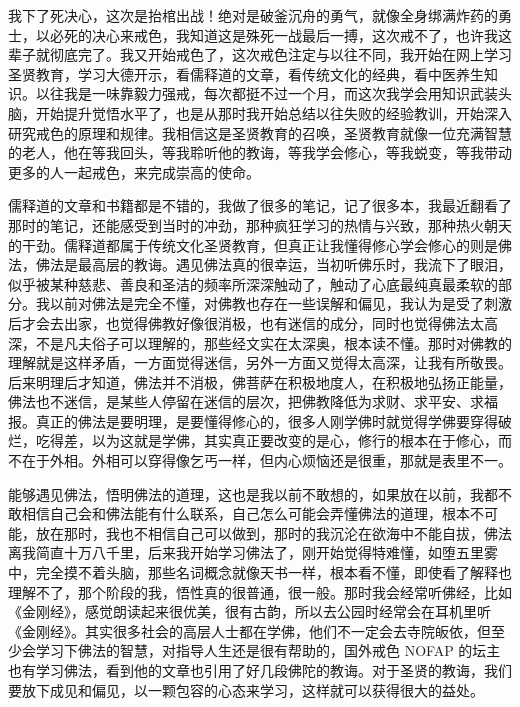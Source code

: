 我下了死决心，这次是抬棺出战！绝对是破釜沉舟的勇气，就像全身绑满炸药的勇士，以必死的决心来戒色，我知道这是殊死一战最后一搏，这次戒不了，也许我这辈子就彻底完了。我又开始戒色了，这次戒色注定与以往不同，我开始在网上学习圣贤教育，学习大德开示，看儒释道的文章，看传统文化的经典，看中医养生知识。以往我是一味靠毅力强戒，每次都挺不过一个月，而这次我学会用知识武装头脑，开始提升觉悟水平了，也是从那时我开始总结以往失败的经验教训，开始深入研究戒色的原理和规律。我相信这是圣贤教育的召唤，圣贤教育就像一位充满智慧的老人，他在等我回头，等我聆听他的教诲，等我学会修心，等我蜕变，等我带动更多的人一起戒色，来完成崇高的使命。

儒释道的文章和书籍都是不错的，我做了很多的笔记，记了很多本，我最近翻看了那时的笔记，还能感受到当时的冲劲，那种疯狂学习的热情与兴致，那种热火朝天的干劲。儒释道都属于传统文化圣贤教育，但真正让我懂得修心学会修心的则是佛法，佛法是最高层的教诲。遇见佛法真的很幸运，当初听佛乐时，我流下了眼泪，似乎被某种慈悲、善良和圣洁的频率所深深触动了，触动了心底最纯真最柔软的部分。我以前对佛法是完全不懂，对佛教也存在一些误解和偏见，我认为是受了刺激后才会去出家，也觉得佛教好像很消极，也有迷信的成分，同时也觉得佛法太高深，不是凡夫俗子可以理解的，那些经文实在太深奥，根本读不懂。那时对佛教的理解就是这样矛盾，一方面觉得迷信，另外一方面又觉得太高深，让我有所敬畏。后来明理后才知道，佛法并不消极，佛菩萨在积极地度人，在积极地弘扬正能量，佛法也不迷信，是某些人停留在迷信的层次，把佛教降低为求财、求平安、求福报。真正的佛法是要明理，是要懂得修心的，很多人刚学佛时就觉得学佛要穿得破烂，吃得差，以为这就是学佛，其实真正要改变的是心，修行的根本在于修心，而不在于外相。外相可以穿得像乞丐一样，但内心烦恼还是很重，那就是表里不一。

能够遇见佛法，悟明佛法的道理，这也是我以前不敢想的，如果放在以前，我都不敢相信自己会和佛法能有什么联系，自己怎么可能会弄懂佛法的道理，根本不可能，放在那时，我也不相信自己可以做到，那时的我沉沦在欲海中不能自拔，佛法离我简直十万八千里，后来我开始学习佛法了，刚开始觉得特难懂，如堕五里雾中，完全摸不着头脑，那些名词概念就像天书一样，根本看不懂，即使看了解释也理解不了，那个阶段的我，悟性真的很普通，很一般。那时我会经常听佛经，比如《金刚经》，感觉朗读起来很优美，很有古韵，所以去公园时经常会在耳机里听《金刚经》。其实很多社会的高层人士都在学佛，他们不一定会去寺院皈依，但至少会学习下佛法的智慧，对指导人生还是很有帮助的，国外戒色 NOFAP 的坛主也有学习佛法，看到他的文章也引用了好几段佛陀的教诲。对于圣贤的教诲，我们要放下成见和偏见，以一颗包容的心态来学习，这样就可以获得很大的益处。

